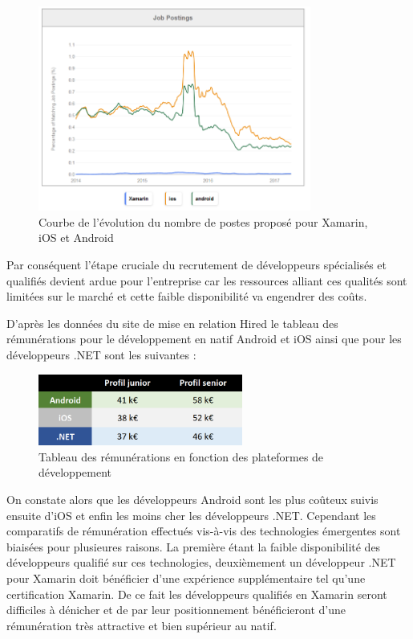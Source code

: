 \documentclass[11]{article}
\begin{document}
   \begin{figure}[h]
    \centering
    \includegraphics[width=0.8\textwidth]{f3}
    \caption{Courbe de l'évolution du nombre de postes proposé pour Xamarin, iOS et Android}
    \label{bat}
\end{figure}

 Par conséquent l’étape cruciale du recrutement de développeurs spécialisés et qualifiés devient ardue pour l’entreprise car les ressources alliant ces qualités sont limitées sur le marché et cette faible disponibilité va engendrer des coûts.
     
\vspace{0.5cm}

D’après les données du site de mise en relation Hired le tableau des rémunérations pour le développement en natif Android et iOS ainsi que pour les développeurs .NET sont les suivantes :

 
   \begin{figure}[h]
    \centering
    \includegraphics[width=0.6\textwidth]{f4}
    \caption{Tableau des rémunérations en fonction des plateformes de développement}
    \label{bat}
\end{figure}
 
 
On constate alors que les développeurs Android sont les plus coûteux suivis ensuite d’iOS et enfin les moins cher les développeurs .NET. Cependant les comparatifs de rémunération effectués vis-à-vis des technologies émergentes sont biaisées pour plusieures raisons. La première étant la faible disponibilité des développeurs qualifié sur ces technologies, deuxièmement un développeur .NET pour Xamarin doit bénéficier d’une expérience supplémentaire tel qu’une certification Xamarin. De ce fait les développeurs qualifiés en Xamarin seront difficiles à dénicher et de par leur positionnement bénéficieront d’une rémunération très attractive et bien supérieur au natif.
\end{document}
